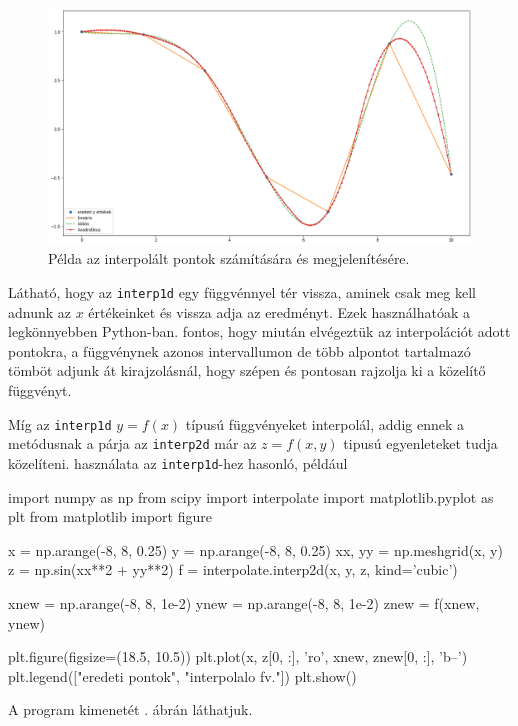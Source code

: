 \begin{figure}[h!]
\centering
\includegraphics[width=\textwidth]{img/interpolate.png}
\caption{Példa az interpolált pontok számítására és megjelenítésére.}
\label{fig:interpolate}
\end{figure}
    
    Látható, hogy az \texttt{interp1d} egy függvénnyel tér vissza, aminek csak meg
kell adnunk az \(x\) értékeinket és vissza adja az eredményt. Ezek
használhatóak a legkönnyebben Python-ban. fontos, hogy miután elvégeztük
az interpolációt adott pontokra, a függvénynek azonos intervallumon de
több alpontot tartalmazó tömböt adjunk át kirajzolásnál, hogy szépen és
pontosan rajzolja ki a közelítő függvényt.

    Míg az \texttt{interp1d} \(y = f(x)\) típusú függvényeket interpolál, addig
ennek a metódusnak a párja az \texttt{interp2d} már az \(z = f(x, y)\)
tipusú egyenleteket tudja közelíteni. használata az
\texttt{interp1d}-hez hasonló, például
\begin{python}
import numpy as np
from scipy import interpolate
import matplotlib.pyplot as plt
from matplotlib import figure

x = np.arange(-8, 8, 0.25)
y = np.arange(-8, 8, 0.25)
xx, yy = np.meshgrid(x, y)
z = np.sin(xx**2 + yy**2)
f = interpolate.interp2d(x, y, z, kind='cubic')

xnew = np.arange(-8, 8, 1e-2)
ynew = np.arange(-8, 8, 1e-2)
znew = f(xnew, ynew)

plt.figure(figsize=(18.5, 10.5))
plt.plot(x, z[0, :], 'ro', xnew, znew[0, :], 'b--')
plt.legend(["eredeti pontok", "interpolalo fv."])
plt.show()
\end{python}
A program kimenetét . ábrán láthatjuk.

